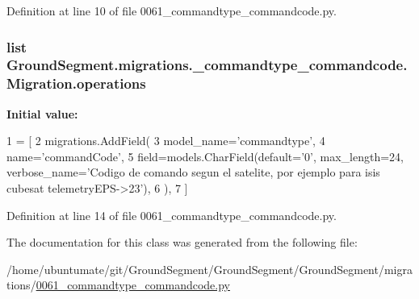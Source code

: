 Definition at line 10 of file 0061\+\_\+commandtype\+\_\+commandcode.\+py.

\hypertarget{class_ground_segment_1_1migrations_1_10061__commandtype__commandcode_1_1_migration_a293d2c70fe9fd940cf4c6129babe8ef0}{}
\subsubsection[{operations}]{\setlength{\rightskip}{0pt plus 5cm}list Ground\+Segment.\+migrations.\+\_\+commandtype\+\_\+commandcode.\+Migration.\+operations\hspace{0.3cm}{\ttfamily [static]}}\label{class_ground_segment_1_1migrations_1_10061__commandtype__commandcode_1_1_migration_a293d2c70fe9fd940cf4c6129babe8ef0}
{\bfseries Initial value\+:}
\begin{DoxyCode}
1 = [
2         migrations.AddField(
3             model\_name=\textcolor{stringliteral}{'commandtype'},
4             name=\textcolor{stringliteral}{'commandCode'},
5             field=models.CharField(default=\textcolor{stringliteral}{'0'}, max\_length=24, verbose\_name=\textcolor{stringliteral}{'Codigo de comando segun el
       satelite, por ejemplo para isis cubesat telemetryEPS->23'}),
6         ),
7     ]
\end{DoxyCode}


Definition at line 14 of file 0061\+\_\+commandtype\+\_\+commandcode.\+py.



The documentation for this class was generated from the following file\+:\begin{DoxyCompactItemize}
\item 
/home/ubuntumate/git/\+Ground\+Segment/\+Ground\+Segment/\+Ground\+Segment/migrations/\hyperlink{0061__commandtype__commandcode_8py}{0061\+\_\+commandtype\+\_\+commandcode.\+py}\end{DoxyCompactItemize}
